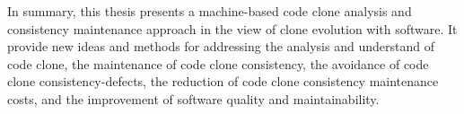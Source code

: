 {%
In summary, this thesis presents a machine-based code clone analysis and consistency maintenance approach in the view of clone evolution with software. It provide new ideas and methods for addressing the analysis and understand of code clone, the maintenance of code clone consistency, the avoidance of code clone consistency-defects, the reduction of code clone consistency maintenance costs, and the improvement of software quality and maintainability.
}


\makecover
\clearpage 
